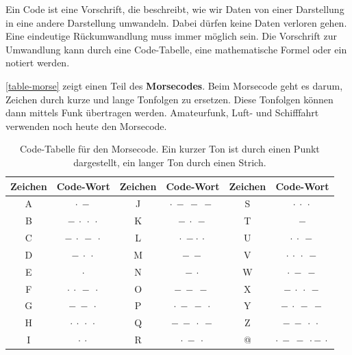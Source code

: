 \begin{definition}[Code]
Ein Code ist eine Vorschrift, die beschreibt, wie wir Daten von einer Darstellung in eine andere Darstellung umwandeln. Dabei dürfen keine Daten verloren gehen. Eine eindeutige Rückumwandlung muss immer möglich sein. Die Vorschrift zur Umwandlung kann durch eine Code-Tabelle, eine mathematische Formel oder ein  notiert werden.
\end{definition}

\begin{example}
\autoref{table-morse} zeigt einen Teil des \textbf{Morsecodes}. Beim Morsecode geht es darum, Zeichen durch kurze und lange Tonfolgen zu ersetzen. Diese Tonfolgen können dann mittels Funk übertragen werden. Amateurfunk, Luft- und Schifffahrt verwenden noch heute den Morsecode. 

\begin{table}[htb]
\centering
\begin{tabular}{|c|c||c|c||c|c|}
\hline
\textbf{Zeichen} & \textbf{Code-Wort} & \textbf{Zeichen} & \textbf{Code-Wort} & \textbf{Zeichen} & \textbf{Code-Wort} \\ \hline
A & $\cdot~-$ & J & $\cdot~-~-~-~$ & S & $\cdot~\cdot~\cdot$ \\ \hline
B & $-~\cdot~\cdot~\cdot$ & K & $-~\cdot~-$ & T & $-$ \\ \hline
C & $-~\cdot~-~\cdot$ & L & $\cdot~-\cdot~\cdot$ & U & $\cdot~\cdot~-$ \\ \hline
D &  $-~\cdot~\cdot$  & M & $-~-$ & V & $\cdot~\cdot~\cdot~-$ \\ \hline
E & $\cdot$ & N & $-~\cdot$ & W & $\cdot~-~-$ \\ \hline
F & $\cdot~\cdot~-~\cdot$ & O & $-~-~-~$ & X & $-~\cdot~\cdot~-$ \\ \hline
G & $-~-~\cdot$ & P & $\cdot~-~-~\cdot$  & Y & $-~\cdot~-~-$ \\ \hline
H & $\cdot~\cdot~\cdot~\cdot$ & Q & $-~-~\cdot~-$ & Z & $-~-~\cdot~\cdot~$ \\ \hline
I & $\cdot~\cdot$ & R & $\cdot~-~\cdot$ & @ & $\cdot~-~-~\cdot-~\cdot$ \\ \hline
\end{tabular}
\caption{Code-Tabelle für den Morsecode. Ein kurzer Ton ist durch einen Punkt dargestellt, ein langer Ton durch einen Strich.}
\label{table-morse}
\end{table}

\end{example}

